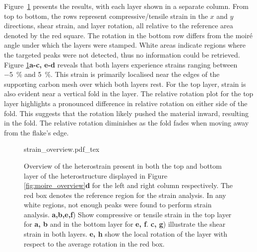 Figure~\ref{fig:strain_overview} presents the results, with each layer shown in a separate column. From top to bottom, the rows represent compressive/tensile strain in the $x$ and $y$ directions, shear strain, and layer rotation, all relative to the reference area denoted by the red square. 
%
The rotation in the bottom row differs from the moiré angle under which the layers were stamped. White areas indicate regions where the targeted peaks were not detected, thus no information could be retrieved.
%
Figure \ref{fig:strain_overview}\textbf{a-c, e-d} reveals that both layers experience strains ranging between \SI{-5}{\percent} and \SI{5}{\percent}. This strain is primarily localised near the edges of the supporting carbon mesh over which both layers rest. 
%
For the top layer, strain is also evident near a vertical fold in the layer. 
%
The relative rotation plot for the top layer highlights a pronounced difference in relative rotation on either side of the fold.
%
This suggests that the rotation likely pushed the material inward, resulting in the fold. 
%
The relative rotation diminishes as the fold fades when moving away from the flake's edge.

\begin{figure}[p]
    \centering
    \def\svgwidth{.74\linewidth}
    {strain_overview.pdf_tex}
    \caption{Overview of the heterostrain present in both the top and bottom layer of the heterostructure displayed in Figure \ref{fig:moire_overview}\textbf{d} for the left and right column respectively. The red box denotes the reference region for the strain analysis. In any white regions, not enough peaks were found to perform strain analysis. \textbf{a,b,e,f}) Show compressive or tensile strain in the top layer for \textbf{a, b} and in the bottom layer for \textbf{e, f}. \textbf{c, g}) illustrate the shear strain in both layers. \textbf{e, h} show the local rotation of the layer with respect to the average rotation in the red box.}
    \label{fig:strain_overview}
\end{figure}
